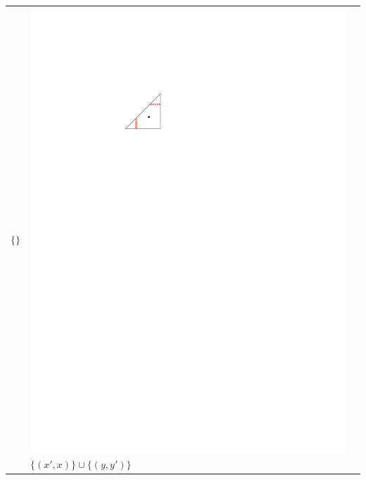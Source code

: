 \documentclass{patmorin}
\begin{document}
\begin{table}
\begin{center}
\begin{tabular}{m{1ex}|>{\centering\arraybackslash}m{}|>{\centering\arraybackslash}m{}}
           $\{\}$  
         & \includegraphics[scale=.8]{figs/killersb-1} \break%
           $\{(x',x)\} \cup \{(y,y')\}$ \\ 

\end{tabular}
\end{center}
\end{table}
\end{document}
